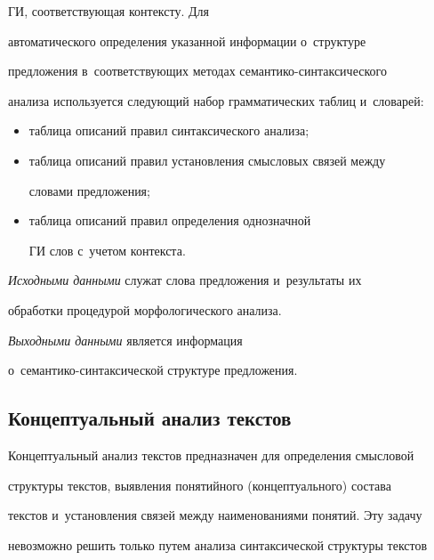 ГИ, соответствующая контексту. Для 


автоматического определения указанной информации о~структуре 


предложения в~со\-от\-вет\-ст\-ву\-ющих методах се\-ман\-ти\-ко-син\-так\-си\-че\-ско\-го 


анализа используется следующий набор грамматических таблиц и~словарей:


  \begin{itemize}


  \item таблица описаний правил синтаксического анализа;


  \item таблица описаний правил установления смысловых связей между 


словами предложения;


  \item таблица описаний правил определения однозначной 


ГИ слов с~учетом кон\-текста.


  \end{itemize}


  


  \textit{Исходными данными} служат слова предложения и~результаты их 


обработки процедурой морфологического анализа. 


  


  \textit{Выходными данными} является информация 


  о~семантико-синтаксической структуре предложения.


  


\subsection{Концептуальный анализ текстов}





Концептуальный анализ текстов предназначен для определения смысловой 


структуры текстов, выявления понятийного (концептуального) состава 


текстов и~установления связей между наименованиями понятий. Эту задачу 


невозможно решить только путем анализа синтаксической структуры текстов 



